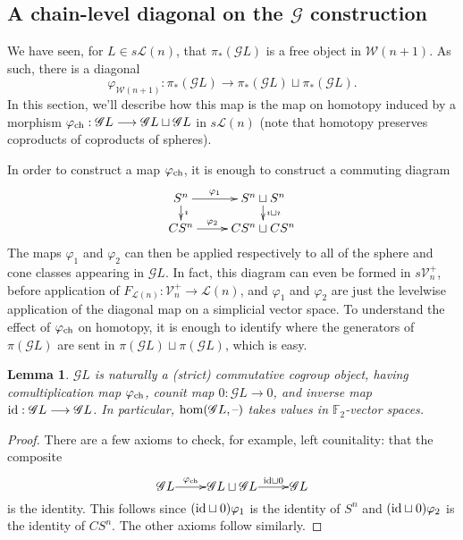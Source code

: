 \documentclass[11pt]{amsart}
\theoremstyle{plain}
\newtheorem{lem}[thm]{Lemma}
\theoremstyle{definition}
\newcommand{\DASH}{\textup{--}}
\let\phi\varphi
\renewcommand{\to}{\longrightarrow}
\newcommand{\scrG}{\mathscr{G}}
\newcommand{\calW}{\mathcal{W}}
\newcommand{\calL}{\mathcal{L}}
\newcommand{\calV}{\mathcal{V}}
\theoremstyle{plain}
\newcommand{\vect}[2]{\calV^{#1}_{#2}}
\newcommand{\BSW}{{\scrG}}
\newcommand{\F}{\mathbb{F}}
\newcommand{\Id}{\textup{id}}
\begin{document}
\begin{comp func sseq old version}
\begin{shaded}\tiny
\subsection{A chain-level diagonal on the $\BSW $ construction}
We have seen, for $L\in s\calL(n)$, that $\pi_*(\BSW L)$ is a free object in $\calW(n+1)$. As such, there is a diagonal
\[\phi_{\calW(n+1)}:\pi_*(\BSW L)\to \pi_*(\BSW L)\sqcup \pi_*(\BSW L).\]
In this section, we'll describe how this map is the map on homotopy induced by a morphism $\phi_\textup{ch}:\BSW L\to \BSW L\sqcup \BSW L$ in $s\calL(n)$ (note that homotopy preserves coproducts of coproducts of spheres). 

In order to construct a map $\phi_\textup{ch}$, it is enough to construct a commuting diagram
\[\xymatrix@R=4mm{
S^n\ar[r]^-{\phi_1}
\ar[d]^-{\imath}
&%
S^n\sqcup S^n\ar[d]^-{\imath\sqcup\imath}
\\%
CS^n\ar[r]^-{\phi_2}
&%
CS^n\sqcup CS^n%
}\]
The maps $\phi_1$ and $\phi_2$ can then be applied respectively to all of the sphere and cone classes appearing in $\BSW L$.
In fact, this diagram can even be formed in $s\vect{+}{n}$, before application of $F_{\calL(n)}:\vect{+}{n}\to\calL(n)$, and $\phi_1$ and $\phi_2$ are just the levelwise application of the diagonal map on a simplicial vector space. To understand the effect of $\phi_{\textup{ch}}$ on homotopy, it is enough to identify where the generators of $\pi(\BSW L)$ are sent in $\pi(\BSW L)\sqcup\pi(\BSW L)$, which is easy.
\begin{lem}
$\BSW L$ is naturally a (strict) commutative cogroup object, having comultiplication map $\phi_{\textup{ch}}$, counit map $0:\BSW L\to 0$, and inverse map $\Id:\BSW L\to \BSW L$. In particular, $\hom(\BSW L,\DASH)$ takes values in $\ensuremath{\F_2}$-vector spaces.
\end{lem}
\begin{proof}
There are a few axioms to check, for example, left counitality: that the composite 
\[\xymatrix@R=4mm@1{
\BSW L\ar[r]^-{\phi_{\textup{ch}}}
&%
\BSW L\sqcup \BSW L\ar[r]^-{\Id\sqcup0}
&%
\BSW L%
}\] is the identity. This follows since $(\Id\sqcup0)\phi_1$ is the identity of $S^n$ and $(\Id\sqcup0)\phi_2$ is the identity of $CS^n$. The other axioms follow similarly.
\end{proof}


\end{shaded}
\end{comp func sseq old version}
\end{document}
